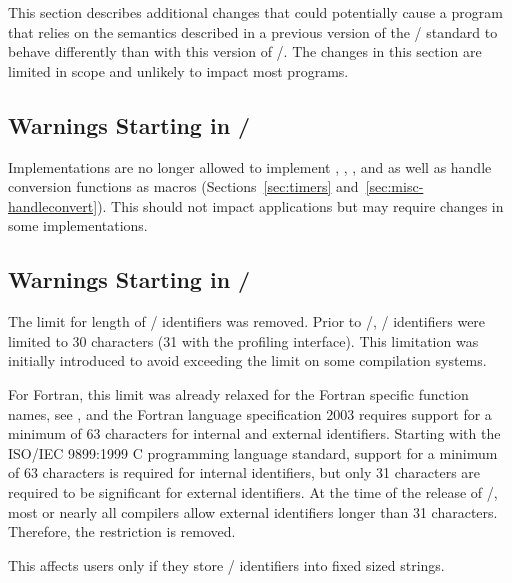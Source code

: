 This section describes additional changes that could potentially cause a program that relies on the semantics described in a previous version of the \MPI/ standard to behave differently than with this version of \MPI/. The changes in this section are limited in scope and unlikely to impact most programs.

\subsection{Warnings Starting in \texorpdfstring{\mpiivdoti/}{MPI-4.1}}
\label{subsec:semantic-changes:warnings:since41}
\label{sec:incompatible:since41} %

Implementations are no longer allowed to implement , , , and 
as well as handle conversion functions as macros (Sections~\ref{sec:timers}
and~\ref{sec:misc-handleconvert}).
This should not impact applications but may require changes in some implementations.

\subsection{Warnings Starting in \texorpdfstring{\mpiivdoto/}{MPI-4.0}}
\label{subsec:semantic-changes:warnings:since40}
\label{sec:incompatible:since40} %

The limit for length of \MPI/ identifiers was removed.
Prior to \MPIIVDOTO/, \MPI/ identifiers were limited to 30 characters
(31 with the profiling interface).
This limitation was initially introduced to avoid exceeding the limit on some compilation systems.

\begin{rationale}
For Fortran, this limit was already relaxed for the Fortran specific function names,
see , and the Fortran language specification 2003
requires support for a minimum of 63 characters for internal and external identifiers.
Starting with the ISO/IEC 9899:1999 C programming language standard,
support for a minimum of 63 characters is required for internal identifiers,
but only 31 characters are required to be significant for external identifiers.
At the time of the release of \MPIIVDOTO/, most or nearly all compilers allow external
identifiers longer than 31 characters. Therefore, the restriction is removed.
\end{rationale}

\begin{users}
This affects users only if they store \MPI/ identifiers into fixed sized strings.
\end{users}
